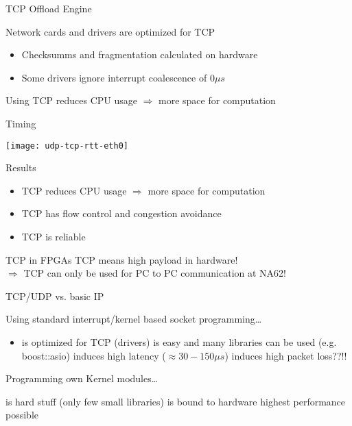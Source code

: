 \begin{frame}{TCP Offload Engine}{}
	\begin{block}{Network cards and drivers are optimized for TCP}
		\begin{itemize}
		  \item Checksumms and fragmentation calculated on hardware
		  \item Some drivers ignore interrupt coalescence of $0 \mu s$
		\end{itemize}
	\end{block}
	\begin{ergo}
		Using TCP reduces CPU usage $\Rightarrow$ more space for computation
	\end{ergo}
\end{frame}

\begin{frame}{Timing}{}
	\begin{center} 
		\texttt{[image: udp-tcp-rtt-eth0]}
	\end{center} 
\end{frame}

\begin{frame}{Results}{}
	\begin{itemize}
	  \item TCP reduces CPU usage $\Rightarrow$ more space for computation
	  \item TCP has flow control and congestion avoidance	
	  \item TCP is reliable
	\end{itemize}
	
	\begin{alertblock}{TCP in FPGAs}
		TCP means high payload in hardware! \\
		$\Rightarrow$ TCP can only be used for PC to PC communication at NA62!
	\end{alertblock}
\end{frame}

\begin{frame}{TCP/UDP vs. basic IP}{}
	\begin{block}{Using standard interrupt/kernel based socket programming\ldots}
		\begin{itemize}
		  \item is optimized for TCP (drivers)
		  \pro is easy and many libraries can be used (e.g. boost::asio)
		  \contra induces high latency ($\approx 30-150 \mu s$)
		  \contra induces high packet loss??!!
		\end{itemize}
	\end{block}
	
	\begin{block}{Programming own Kernel modules\ldots}
		\begin{itemize}
		  \contra is hard stuff (only few small libraries)
		  \contra is bound to hardware
		  \pro highest performance possible
		\end{itemize}
	\end{block}
\end{frame}

	